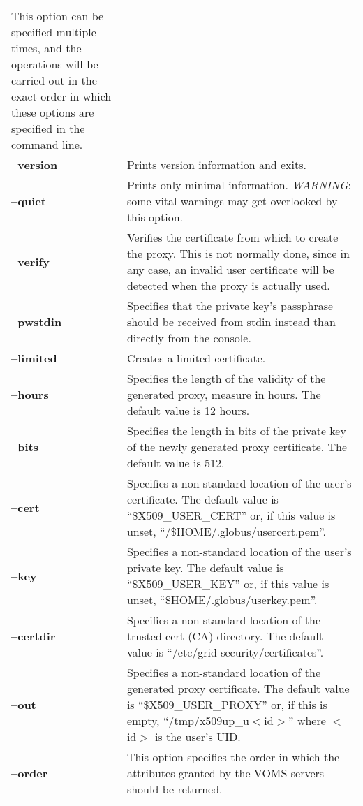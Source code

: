 \documentclass[a4paper]{book}
\begin{document}
\begin{longtable}{lp{3in}}
		      This option can be specified multiple times, and
		      the operations will be carried out in the exact
		      order in which these options are specified in the
		      command line.\\
\textbf{--version}  & Prints version information and exits.\\
\textbf{--quiet}    & Prints only minimal information.
		      \emph{WARNING}: some vital warnings may get
		      overlooked by this option.\\
\textbf{--verify}   & Verifies the certificate from which to create the
		      proxy.  This is not normally done, since in any
		      case, an invalid user certificate will be
		      detected when the proxy is actually used.\\
\textbf{--pwstdin}  & Specifies that the private key's passphrase
		      should be received from stdin instead than
		      directly from the console.\\
\textbf{--limited}  & Creates a limited certificate.\\
\textbf{--hours}    & Specifies the length of the validity of the
		      generated proxy, measure in hours.  The default
		      value is 12 hours.\\
\textbf{--bits}     & Specifies the length in bits of the private key
		      of the newly generated proxy certificate.  The
		      default value is 512.\\
\textbf{--cert}     & Specifies a non-standard location of the user's
		      certificate.  The default value is
		      ``\$X509\_USER\_CERT'' or, if this value is unset,
		      ``/\$HOME/.globus/usercert.pem''.\\
\textbf{--key}      & Specifies a non-standard location of the user's
		      private key.  The default value is
		      ``\$X509\_USER\_KEY'' or, if this value is unset,
		      ``\$HOME/.globus/userkey.pem''.\\
\textbf{--certdir}  & Specifies a non-standard location of the trusted
		      cert (CA) directory.  The default value is
		      ``/etc/grid-security/certificates''.\\ 
\textbf{--out}      & Specifies a non-standard location of the
		      generated proxy certificate.  The default value
		      is ``\$X509\_USER\_PROXY'' or, if this is empty,
		      ``/tmp/x509up\_u$<$id$>$'' where $<$id$>$ is the
		      user's UID.\\
\textbf{--order}    & This option specifies the order in which the
		      attributes granted by the VOMS servers should be
		      returned.  


\end{longtable}
\end{document}
